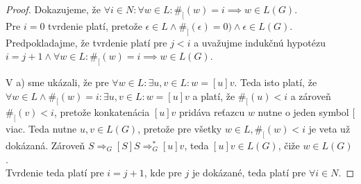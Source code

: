 \documentclass[10pt]{article}
\begin{document}
\begin{proof}
    Dokazujeme, že $\forall i \in N: \forall w \in L: \#_[(w) = i \implies w \in L(G)$.\\
    Pre $i = 0$ tvrdenie platí, pretože $\epsilon \in L \land \#_[(\epsilon) = 0) \land \epsilon \in
    L(G).$ \\

    Predpokladajme, že tvrdenie platí pre $j <  i$ a uvažujme indukčnú hypotézu $i = j+1 \land
    \forall w \in L: \#_[(w) = i \implies w \in L(G)$.

    V a) sme ukázali, že pre $\forall w \in L: \exists u,v \in L: w = [u]v$. Teda isto platí, že
    $\forall w \in L \land \#_[(w) = i: \exists u,v \in L: w = [u]v$ a platí, že $\#_[(u) < i$ a zároveň
    $\#_[(v) < i$, pretože konkatenácia $[u]v$ pridáva reťazcu $w$ nutne o jeden symbol $[$ viac.
    Teda nutne $u,v \in L(G)$, pretože pre všetky $w\in L, \#_[(w) < i$ je veta už dokázaná. Zároveň $S \Rightarrow_G [S]S \Rightarrow_G^* [u]v$,
    teda $[u]v \in L(G)$, čiže $w \in L(G)$. \\

    Tvrdenie teda platí pre $i = j + 1$, kde pre $j$ je dokázané, teda platí pre $\forall i \in N$. 
\end{proof}
\end{document}
